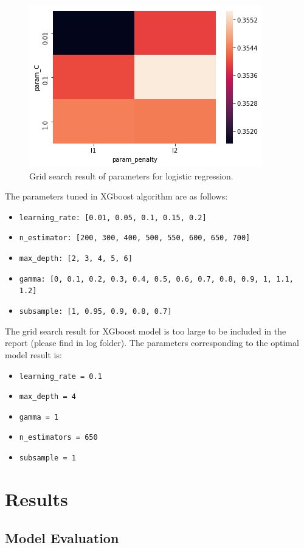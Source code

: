 \documentclass[12pt]{article}
\begin{document}
\begin{figure}[ht]
\includegraphics[scale=0.6]{figure/logit_parameter.png}
\centering
\caption{Grid search result of parameters for logistic regression.}
\label{fig:logit}
\end{figure}

The parameters tuned in XGboost algorithm are as follows:
\begin{itemize}
\item \verb|learning_rate: [0.01, 0.05, 0.1, 0.15, 0.2]|
\item \verb|n_estimator: [200, 300, 400, 500, 550, 600, 650, 700]|
\item \verb|max_depth: [2, 3, 4, 5, 6]|
\item \verb|gamma: [0, 0.1, 0.2, 0.3, 0.4, 0.5, 0.6, 0.7, 0.8, 0.9, 1, 1.1, 1.2]| 
\item \verb|subsample: [1, 0.95, 0.9, 0.8, 0.7]|
\end{itemize}

The grid search result for XGboost model is too large to be included in the report (please find in log folder). The parameters corresponding to the optimal model result is: 
\begin{itemize}
\item \verb|learning_rate = 0.1|
\item \verb|max_depth = 4|
\item \verb|gamma = 1|
\item \verb|n_estimators = 650|
\item \verb|subsample = 1|
\end{itemize}

\section{Results}
\subsection{Model Evaluation}
\end{document}
